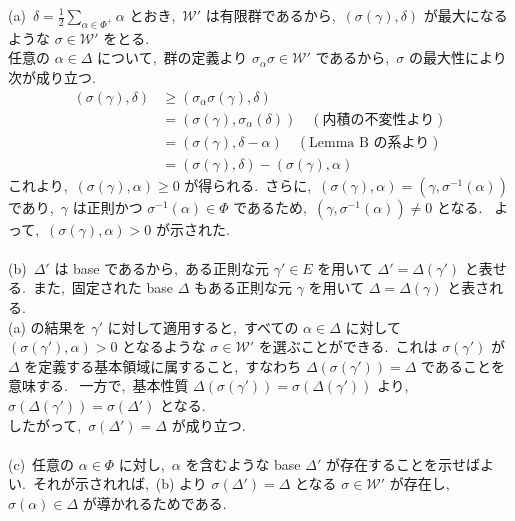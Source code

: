 \documentclass[uplatex,dvipdfmx]{jsarticle}
\begin{document}
\begin{myproof}
    (a)~$\delta = \frac{1}{2} \sum_{\alpha \in \Phi^+} \alpha$ とおき,~$\mathcal{W}'$ は有限群であるから,~$(\sigma(\gamma), \delta)$ が最大になるような $\sigma \in \mathcal{W}'$ をとる.\\
    任意の $\alpha \in \Delta$ について,~群の定義より $\sigma_\alpha \sigma \in \mathcal{W}'$ であるから,~$\sigma$ の最大性により次が成り立つ.~
    \begin{equation*}
        \begin{split}
            (\sigma(\gamma), \delta) &\ge (\sigma_\alpha \sigma(\gamma), \delta) \\
                &= (\sigma(\gamma), \sigma_\alpha(\delta)) \quad (\text{内積の不変性より}) \\
                &= (\sigma(\gamma), \delta - \alpha) \quad (\text{Lemma B の系より}) \\
                &= (\sigma(\gamma), \delta) - (\sigma(\gamma), \alpha)
        \end{split}
    \end{equation*}
    これより,~$(\sigma(\gamma), \alpha) \ge 0$ が得られる.~さらに,~$(\sigma(\gamma), \alpha) = (\gamma, \sigma^{-1}(\alpha))$ であり,~$\gamma$ は正則かつ $\sigma^{-1}(\alpha) \in \Phi$ であるため,~$(\gamma, \sigma^{-1}(\alpha)) \neq 0$ となる.~
    よって,~$(\sigma(\gamma), \alpha) > 0$ が示された.~\\\\
    (b)~$\Delta'$ は base であるから,~ある正則な元 $\gamma' \in E$ を用いて $\Delta' = \Delta(\gamma')$ と表せる.~また,~固定された base $\Delta$ もある正則な元 $\gamma$ を用いて $\Delta = \Delta(\gamma)$ と表される.~\\
    (a) の結果を $\gamma'$ に対して適用すると,~すべての $\alpha \in \Delta$ に対して $(\sigma(\gamma'), \alpha) > 0$ となるような $\sigma \in \mathcal{W}'$ を選ぶことができる.~これは $\sigma(\gamma')$ が $\Delta$ を定義する基本領域に属すること,~すなわち $\Delta(\sigma(\gamma')) = \Delta$ であることを意味する.~
    一方で,~基本性質 $\Delta(\sigma(\gamma')) = \sigma(\Delta(\gamma'))$ より,~$\sigma(\Delta(\gamma')) = \sigma(\Delta')$ となる.~\\
    したがって,~$\sigma(\Delta') = \Delta$ が成り立つ.~\\\\
    (c)~任意の $\alpha \in \Phi$ に対し,~$\alpha$ を含むような base $\Delta'$ が存在することを示せばよい.~それが示されれば,~(b) より $\sigma(\Delta') = \Delta$ となる $\sigma \in \mathcal{W}'$ が存在し,~$\sigma(\alpha) \in \Delta$ が導かれるためである.~

\end{myproof}
\end{document}
